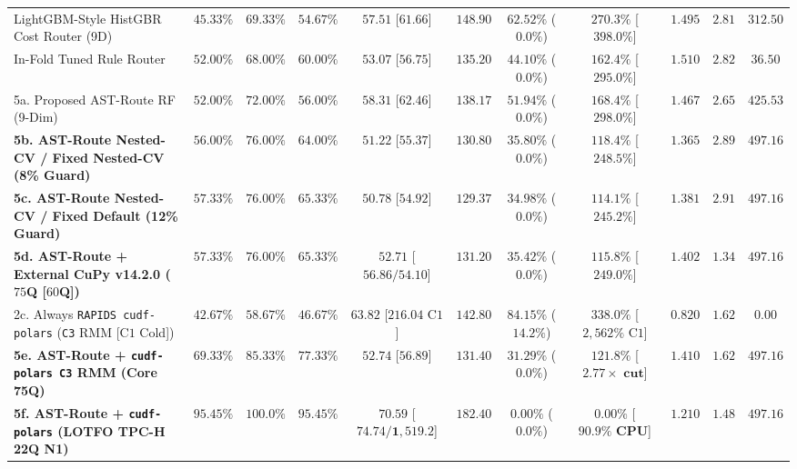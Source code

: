 \documentclass[10pt,a4paper]{article}
\newenvironment{fitasttable}{%
  \begin{lrbox}{\asttblbox}%
}{%
  \end{lrbox}%
  \sbox{\asttblboxB}{%
    \ifdim\wd\asttblbox>0.96\textwidth
      \resizebox{0.96\textwidth}{!}{\usebox{\asttblbox}}%
    \else
      \usebox{\asttblbox}%
    \fi
  }%
  \ifdim\ht\asttblboxB>0.72\textheight
    \resizebox{!}{0.72\textheight}{\usebox{\asttblboxB}}%
  \else
    \usebox{\asttblboxB}%
  \fi
}
\begin{document}
\begin{table}[!htbp]
\begin{fitasttable}
\begin{tabular}{@{}lcccccccccc@{}}
LightGBM-Style HistGBR Cost Router (9D) & $45.33\%$ & $69.33\%$ & $54.67\%$ & $57.51$ [$61.66$] & $148.90$ & $62.52\%$ ($0.0\%$) & $270.3\%$ [$398.0\%$] & $1.495$ & $2.81$ & $312.50$ \\
In-Fold Tuned Rule Router & $52.00\%$ & $68.00\%$ & $60.00\%$ & $53.07$ [$56.75$] & $135.20$ & $44.10\%$ ($0.0\%$) & $162.4\%$ [$295.0\%$] & $1.510$ & $2.82$ & $36.50$ \\
5a. Proposed AST-Route RF (9-Dim) & $52.00\%$ & $72.00\%$ & $56.00\%$ & $58.31$ [$62.46$] & $138.17$ & $51.94\%$ ($0.0\%$) & $168.4\%$ [$298.0\%$] & $1.467$ & $2.65$ & $425.53$ \\
\textbf{5b. AST-Route Nested-CV / Fixed Nested-CV (8\% Guard)} & $\mathbf{56.00\%}$ & $\mathbf{76.00\%}$ & $\mathbf{64.00\%}$ & $\mathbf{51.22}$ [$\mathbf{55.37}$] & $\mathbf{130.80}$ & $\mathbf{35.80\%}$ ($\mathbf{0.0\%}$) & $\mathbf{118.4\%}$ [$\mathbf{248.5\%}$] & $\mathbf{1.365}$ & $\mathbf{2.89}$ & $\mathbf{497.16}$ \\
\textbf{5c. AST-Route Nested-CV / Fixed Default (12\% Guard)} & $\mathbf{57.33\%}$ & $\mathbf{76.00\%}$ & $\mathbf{65.33\%}$ & $\mathbf{50.78}$ [$\mathbf{54.92}$] & $\mathbf{129.37}$ & $\mathbf{34.98\%}$ ($\mathbf{0.0\%}$) & $\mathbf{114.1\%}$ [$\mathbf{245.2\%}$] & $\mathbf{1.381}$ & $\mathbf{2.91}$ & $\mathbf{497.16}$ \\
\textbf{5d. AST-Route + External CuPy v14.2.0 ($75$Q [$60$Q])} & $\mathbf{57.33\%}$ & $\mathbf{76.00\%}$ & $\mathbf{65.33\%}$ & $\mathbf{52.71}$ [$\mathbf{56.86 / 54.10}$] & $\mathbf{131.20}$ & $\mathbf{35.42\%}$ ($\mathbf{0.0\%}$) & $\mathbf{115.8\%}$ [$\mathbf{249.0\%}$] & $\mathbf{1.402}$ & $\mathbf{1.34}$ & $\mathbf{497.16}$ \\
2c. Always \texttt{RAPIDS cudf-polars} (\texttt{C3} RMM [$\text{C1}$ Cold]) & $42.67\%$ & $58.67\%$ & $46.67\%$ & $63.82$ [$216.04\text{ C1}$] & $142.80$ & $84.15\%$ ($14.2\%$) & $338.0\%$ [$2{,}562\%\text{ C1}$] & $0.820$ & $1.62$ & $0.00$ \\
\textbf{5e. AST-Route + \texttt{cudf-polars C3} RMM (Core 75Q)} & $\mathbf{69.33\%}$ & $\mathbf{85.33\%}$ & $\mathbf{77.33\%}$ & $\mathbf{52.74}$ [$\mathbf{56.89}$] & $\mathbf{131.40}$ & $\mathbf{31.29\%}$ ($\mathbf{0.0\%}$) & $\mathbf{121.8\%}$ [$\mathbf{2.77\times\text{ cut}}$] & $\mathbf{1.410}$ & $\mathbf{1.62}$ & $\mathbf{497.16}$ \\
\textbf{5f. AST-Route + \texttt{cudf-polars} (LOTFO TPC-H 22Q N1)} & $\mathbf{95.45\%}$ & $\mathbf{100.0\%}$ & $\mathbf{95.45\%}$ & $\mathbf{70.59}$ [$\mathbf{74.74 / 1{,}519.2}$] & $\mathbf{182.40}$ & $\mathbf{0.00\%}$ ($\mathbf{0.0\%}$) & $\mathbf{0.00\%}$ [$\mathbf{90.9\%\text{ CPU}}$] & $\mathbf{1.210}$ & $\mathbf{1.48}$ & $\mathbf{497.16}$ \\

\end{tabular}
\end{fitasttable}
\end{table}
\end{document}
